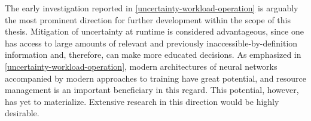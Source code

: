 The early investigation reported in \cref{uncertainty-workload-operation} is
arguably the most prominent direction for further development within the scope
of this thesis. Mitigation of uncertainty at runtime is considered advantageous,
since one has access to large amounts of relevant and previously
inaccessible-by-definition information and, therefore, can make more educated
decisions. As emphasized in \cref{uncertainty-workload-operation}, modern
architectures of neural networks accompanied by modern approaches to training
have great potential, and resource management is an important beneficiary in
this regard. This potential, however, has yet to materialize. Extensive research
in this direction would be highly desirable.
